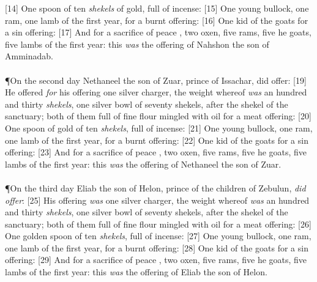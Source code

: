 [14] \textcolor[cmyk]{0.99998,1,0,0}{One spoon of ten \emph{shekels} of gold, full of incense:}
[15] \textcolor[cmyk]{0.99998,1,0,0}{One young bullock, one ram, one lamb of the first year, for a burnt offering:}
[16] \textcolor[cmyk]{0.99998,1,0,0}{One kid of the goats for a sin offering:}
[17] \textcolor[cmyk]{0.99998,1,0,0}{And for a sacrifice of peace , two oxen, five rams, five he goats, five lambs of the first year: this \emph{was} the offering of Nahshon the son of Amminadab.}\\
\\
\P \textcolor[cmyk]{0.99998,1,0,0}{On the second day Nethaneel the son of Zuar, prince of Issachar, did offer:}
[19] \textcolor[cmyk]{0.99998,1,0,0}{He offered \emph{for} his offering one silver charger, the weight whereof \emph{was} an hundred and thirty \emph{shekels}, one silver bowl of seventy shekels, after the shekel of the sanctuary; both of them full of fine flour mingled with oil for a meat offering:}
[20] \textcolor[cmyk]{0.99998,1,0,0}{One spoon of gold of ten \emph{shekels}, full of incense:}
[21] \textcolor[cmyk]{0.99998,1,0,0}{One young bullock, one ram, one lamb of the first year, for a burnt offering:}
[22] \textcolor[cmyk]{0.99998,1,0,0}{One kid of the goats for a sin offering:}
[23] \textcolor[cmyk]{0.99998,1,0,0}{And for a sacrifice of peace , two oxen, five rams, five he goats, five lambs of the first year: this \emph{was} the offering of Nethaneel the son of Zuar.}\\
\\
\P \textcolor[cmyk]{0.99998,1,0,0}{On the third day Eliab the son of Helon, prince of the children of Zebulun, \emph{did} \emph{offer}:}
[25] \textcolor[cmyk]{0.99998,1,0,0}{His offering \emph{was} one silver charger, the weight whereof \emph{was} an hundred and thirty \emph{shekels}, one silver bowl of seventy shekels, after the shekel of the sanctuary; both of them full of fine flour mingled with oil for a meat offering:}
[26] \textcolor[cmyk]{0.99998,1,0,0}{One golden spoon of ten \emph{shekels}, full of incense:}
[27] \textcolor[cmyk]{0.99998,1,0,0}{One young bullock, one ram, one lamb of the first year, for a burnt offering:}
[28] \textcolor[cmyk]{0.99998,1,0,0}{One kid of the goats for a sin offering:}
[29] \textcolor[cmyk]{0.99998,1,0,0}{And for a sacrifice of peace , two oxen, five rams, five he goats, five lambs of the first year: this \emph{was} the offering of Eliab the son of Helon.}\\

